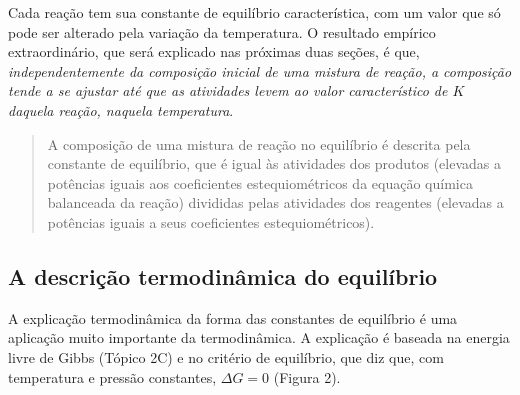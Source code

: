 Cada reação tem sua constante de equilíbrio característica, com um valor que só pode ser alterado pela variação da temperatura. O resultado empírico
extraordinário, que será explicado nas próximas duas seções, é que, \emph{independentemente da composição inicial de uma mistura de reação, a
composição tende a se ajustar até que as atividades levem ao valor característico de \(K\) daquela reação, naquela temperatura}.

\begin{quote}
A composição de uma mistura de reação no equilíbrio é descrita pela constante de equilíbrio, que é igual às atividades dos produtos (elevadas a
potências iguais aos coeficientes estequiométricos da equação química balanceada da reação) divididas pelas atividades dos reagentes (elevadas a
potências iguais a seus coeficientes estequiométricos).
\end{quote}

\subsection{A descrição termodinâmica do equilíbrio}

A explicação termodinâmica da forma das constantes de equilíbrio é uma aplicação muito importante da termodinâmica. A explicação é baseada na energia
livre de Gibbs (Tópico 2C) e no critério de equilíbrio, que diz que, com temperatura e pressão constantes, \(\Delta G = 0\) (Figura 2).

